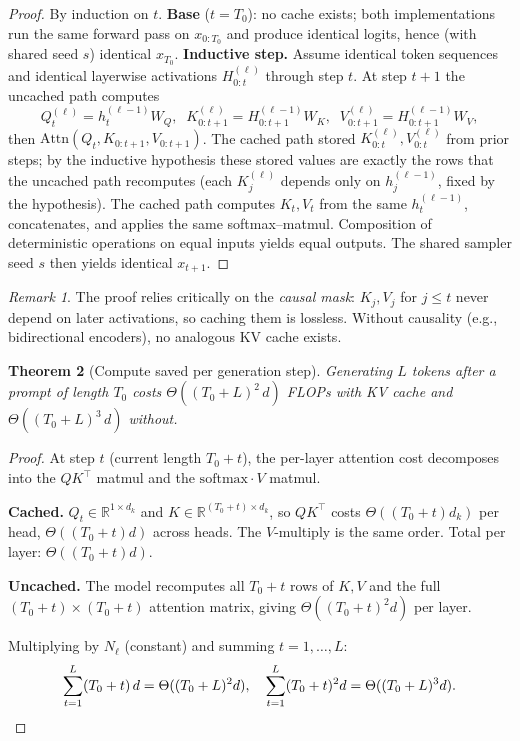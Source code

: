 \documentclass[11pt]{article}
\newtheorem{theorem}{Theorem}[section]
\theoremstyle{remark}
\newtheorem{remark}[theorem]{Remark}
\begin{document}
\begin{proof}
By induction on $t$. \textbf{Base} ($t = T_0$): no cache exists; both implementations run the same forward pass on $x_{0:T_0}$ and produce identical logits, hence (with shared seed $s$) identical $x_{T_0}$. \textbf{Inductive step.} Assume identical token sequences and identical layerwise activations $H^{(\ell)}_{0:t}$ through step $t$. At step $t+1$ the uncached path computes
\[ Q_t^{(\ell)} = h_t^{(\ell-1)} W_Q, \;\; K_{0:t+1}^{(\ell)} = H^{(\ell-1)}_{0:t+1} W_K, \;\; V_{0:t+1}^{(\ell)} = H^{(\ell-1)}_{0:t+1} W_V, \]
then $\mathrm{Attn}(Q_t, K_{0:t+1}, V_{0:t+1})$. The cached path stored $K_{0:t}^{(\ell)}, V_{0:t}^{(\ell)}$ from prior steps; by the inductive hypothesis these stored values are exactly the rows that the uncached path recomputes (each $K_j^{(\ell)}$ depends only on $h_j^{(\ell-1)}$, fixed by the hypothesis). The cached path computes $K_t, V_t$ from the same $h_t^{(\ell-1)}$, concatenates, and applies the same softmax--matmul. Composition of deterministic operations on equal inputs yields equal outputs. The shared sampler seed $s$ then yields identical $x_{t+1}$.
\end{proof}

\begin{remark}
The proof relies critically on the \emph{causal mask}: $K_j, V_j$ for $j \leq t$ never depend on later activations, so caching them is lossless. Without causality (e.g., bidirectional encoders), no analogous KV cache exists.
\end{remark}

\begin{theorem}[Compute saved per generation step]\label{thm:compute}
Generating $L$ tokens after a prompt of length $T_0$ costs $\Theta((T_0 + L)^2 \, d)$ FLOPs with KV cache and $\Theta((T_0 + L)^3 \, d)$ without.
\end{theorem}

\begin{proof}
At step $t$ (current length $T_0 + t$), the per-layer attention cost decomposes into the $QK^\top$ matmul and the $\mathrm{softmax} \cdot V$ matmul.

\textbf{Cached.} $Q_t \in \mathbb{R}^{1 \times d_k}$ and $K \in \mathbb{R}^{(T_0+t) \times d_k}$, so $Q K^\top$ costs $\Theta((T_0+t) d_k)$ per head, $\Theta((T_0+t) d)$ across heads. The $V$-multiply is the same order. Total per layer: $\Theta((T_0 + t) d)$.

\textbf{Uncached.} The model recomputes all $T_0 + t$ rows of $K, V$ and the full $(T_0+t) \times (T_0+t)$ attention matrix, giving $\Theta((T_0 + t)^2 d)$ per layer.

Multiplying by $N_\ell$ (constant) and summing $t = 1, \ldots, L$:
\[ \sum_{t=1}^{L}(T_0+t)\,d = \Theta((T_0+L)^2 d), \quad \sum_{t=1}^{L}(T_0+t)^2 d = \Theta((T_0+L)^3 d). \qedhere \]
\end{proof}
\end{document}
